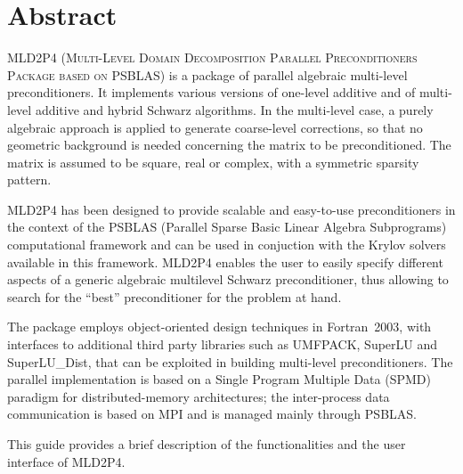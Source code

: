 \section*{Abstract}
\textsc{MLD2P4 (Multi-Level Domain Decomposition Parallel Preconditioners Package based on
PSBLAS}) is a package of parallel algebraic multi-level preconditioners.
It implements various versions of one-level additive and of multi-level additive
and hybrid Schwarz algorithms. In the multi-level case, a purely algebraic approach
is applied to generate coarse-level corrections, so that no geometric background is needed
concerning the matrix to be preconditioned. The matrix is assumed to be square, real
or complex, with a symmetric sparsity pattern. 

MLD2P4 has been designed to provide scalable and easy-to-use preconditioners in the
context of the PSBLAS (Parallel Sparse Basic Linear Algebra Subprograms)
computational framework and can be used in conjuction with the Krylov solvers
available in this framework. MLD2P4 enables the user to easily specify different aspects
of a generic algebraic multilevel Schwarz preconditioner, thus allowing to search
for the ``best'' preconditioner for the problem at hand. 

The package employs object-oriented design techniques in
Fortran~2003, with interfaces to additional third party libraries 
such as UMFPACK, SuperLU and SuperLU\_Dist, that
can be exploited in building multi-level preconditioners. The parallel
implementation is based on a Single Program Multiple Data (SPMD)
paradigm for distributed-memory architectures; the inter-process data
communication is based on MPI and is managed mainly through PSBLAS.

This guide provides a brief description of the functionalities and
the user interface of MLD2P4.
